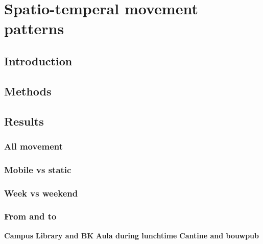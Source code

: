 \chapter{Spatio-temperal movement patterns}
\section{Introduction}
\section{Methods}

\section{Results}\label{results}
\subsection{All movement}
\subsection{Mobile vs static}
\subsection{Week vs weekend}
\subsection{From and to}
\textbf{Campus}
\textbf{Library and BK}
\textbf{Aula during lunchtime}
\textbf{Cantine and bouwpub}